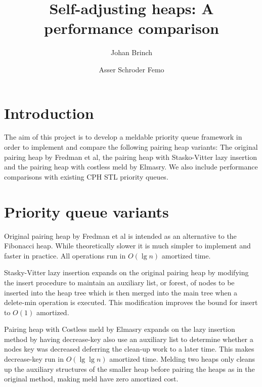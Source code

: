 \documentclass{DIKU-article}[2010/01/13]
\title{Self-adjusting heaps: A performance comparison}
\author{%
Johan Brinch
\and
Asser Schroder Femo
}
\institute{%
Department of Computing, University of Copenhagen\\
Universitetsparken 1, DK-2100 Copenhagen East, Denmark\\
\email{...@diku.dk}
\and
\email{asser@diku.dk}%
}
\begin{document}
\maketitle

\begin{abstract}
\end{abstract}

\begin{subject}
\end{subject}

\section{Introduction}

The aim of this project is to develop a meldable priority queue framework in
order to implement and compare the following pairing heap variants: The original
pairing heap by Fredman et al, the pairing heap with Stasko-Vitter lazy insertion and
the pairing heap with costless meld by Elmasry. We also include performance
comparisons with existing CPH STL priority queues.

\section{Priority queue variants}

\begin{description}
\item{Original pairing heap} by Fredman et al\cite{fredman} is intended as an
alternative to the Fibonacci heap. While theoretically slower it is much simpler 
to implement and faster in practice. All operations run in $O(\lg n)$ amortized time.

\item{Stasky-Vitter lazy insertion} expands on the original pairing heap by
modifying the insert procedure to maintain an auxiliary list, or forest, of
nodes to be inserted into the heap tree which is then merged into the main tree
when a delete-min operation is executed. This modification improves the bound
for insert to $O(1)$ amortized.

\item{Pairing heap with Costless meld} by Elmasry\cite{costlessmeld} expands on
the lazy insertion method by having decrease-key also use an auxiliary list to
determine whether a nodes key was decreased deferring the clean-up work to a
later time. This makes decrease-key run in $O(\lg \lg n)$ amortized time.
Melding two heaps only cleans up the auxiliary structures of the smaller heap
before pairing the heaps as in the original method, making meld have zero
amortized cost.
\end{description}
\end{document}
